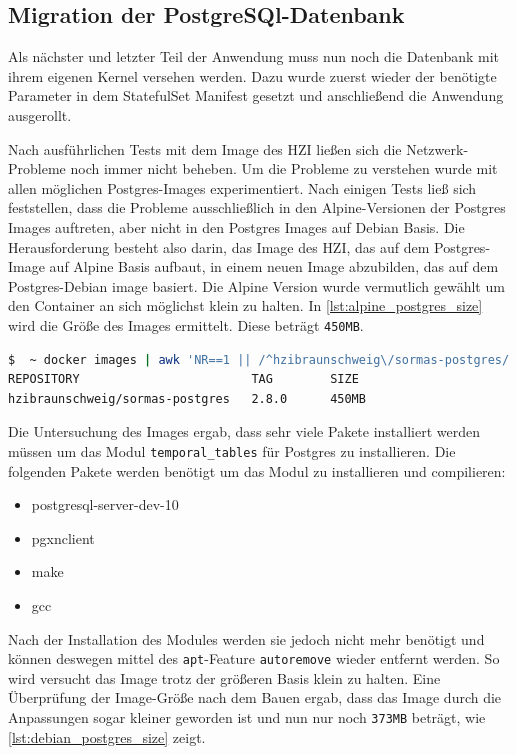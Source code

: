 \subsection{Migration der PostgreSQl-Datenbank}
Als nächster und letzter Teil der Anwendung muss nun noch die Datenbank mit ihrem eigenen Kernel versehen werden.
Dazu wurde zuerst wieder der benötigte Parameter in dem StatefulSet Manifest gesetzt und anschließend die Anwendung ausgerollt.


Nach ausführlichen Tests mit dem Image des HZI ließen sich die Netzwerk-Probleme noch immer nicht beheben.
Um die Probleme zu verstehen wurde mit allen möglichen Postgres-Images experimentiert.
Nach einigen Tests ließ sich feststellen, dass die Probleme ausschließlich in den Alpine-Versionen der Postgres Images auftreten, aber nicht in den Postgres Images auf Debian Basis. 
Die Herausforderung besteht also darin, das Image des \ac{HZI}, das auf dem Postgres-Image auf Alpine Basis aufbaut, in einem neuen Image abzubilden, das auf dem Postgres-Debian image basiert.
Die Alpine Version wurde vermutlich gewählt um den Container an sich möglichst klein zu halten. 
In \ref{lst:alpine_postgres_size} wird die Größe des Images ermittelt.
Diese beträgt \texttt{450MB}.

\begin{lstlisting}[language=bash, caption={Größe des Postgres Images}, label=lst:alpine_postgres_size]
$  ~ docker images | awk 'NR==1 || /^hzibraunschweig\/sormas-postgres/ {printf "%-33s %-10s %s\n", $1, $2, $NF}'
REPOSITORY                        TAG        SIZE
hzibraunschweig/sormas-postgres   2.8.0      450MB
\end{lstlisting}

Die Untersuchung des Images ergab, dass sehr viele Pakete installiert werden müssen um das Modul \texttt{temporal\_tables} für Postgres zu installieren.
Die folgenden Pakete werden benötigt um das Modul zu installieren und compilieren:
\begin{itemize}
  \item postgresql-server-dev-10
  \item pgxnclient 
  \item make
  \item gcc
\end{itemize}

Nach der Installation des Modules werden sie jedoch nicht mehr benötigt und können deswegen mittel des \texttt{apt}-Feature \texttt{autoremove} wieder entfernt werden. 
So wird versucht das Image trotz der größeren Basis klein zu halten.
Eine Überprüfung der Image-Größe nach dem Bauen ergab, dass das Image durch die Anpassungen sogar kleiner geworden ist und nun nur noch \texttt{373MB} beträgt, wie \ref{lst:debian_postgres_size} zeigt.

